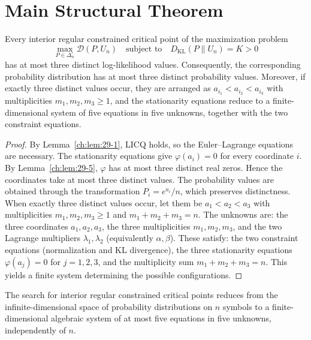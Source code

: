 \section{Main Structural Theorem}
\begin{theorem}
\label{ch:thm:29-3}
Every interior regular constrained critical point of the maximization problem
\[
\max_{P\in\Delta_n^\circ}\mathcal D(P,U_n)\quad\text{subject to}\quad D_{\mathrm{KL}}(P\|U_n)=K>0
\]
has at most three distinct log-likelihood values. Consequently, the corresponding probability distribution has at most three distinct probability values.
Moreover, if exactly three distinct values occur, they are arranged as \(a_{i_1}<a_{i_2}<a_{i_3}\) with multiplicities \(m_1,m_2,m_3\ge1\), and the stationarity equations reduce to a finite-dimensional system of five equations in five unknowns, together with the two constraint equations.
\end{theorem}
\begin{proof}
By Lemma~\ref{ch:lem:29-1}, LICQ holds, so the Euler--Lagrange equations are necessary. The stationarity equations give \(\varphi(a_i)=0\) for every coordinate \(i\). By Lemma~\ref{ch:lem:29-5}, \(\varphi\) has at most three distinct real zeros. Hence the coordinates take at most three distinct values.
The probability values are obtained through the transformation \(P_i=e^{a_i}/n\), which preserves distinctness.
When exactly three distinct values occur, let them be \(a_1<a_2<a_3\) with multiplicities \(m_1,m_2,m_3\ge1\) and \(m_1+m_2+m_3=n\). The unknowns are: the three coordinates \(a_1,a_2,a_3\), the three multiplicities \(m_1,m_2,m_3\), and the two Lagrange multipliers \(\lambda_1,\lambda_2\) (equivalently \(\alpha,\beta\)). These satisfy: the two constraint equations (normalization and KL divergence), the three stationarity equations \(\varphi(a_j)=0\) for \(j=1,2,3\), and the multiplicity sum \(m_1+m_2+m_3=n\). This yields a finite system determining the possible configurations. 
\end{proof}
\begin{corollary}
\label{ch:cor:29-2}
The search for interior regular constrained critical points reduces from the infinite-dimensional space of probability distributions on \(n\) symbols to a finite-dimensional algebraic system of at most five equations in five unknowns, independently of \(n\).
\end{corollary}
